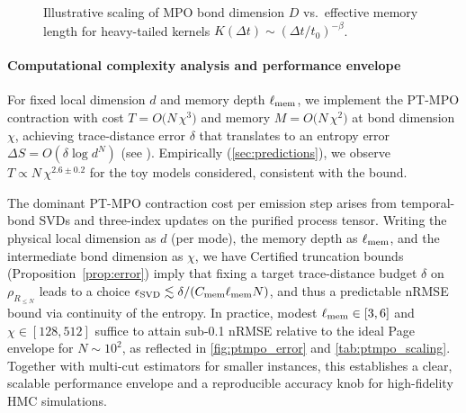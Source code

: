 \documentclass[a4paper,11pt]{article}
\newcommand{\HMC}{\textsc{HMC}\xspace}
\theoremstyle{plain}
\theoremstyle{definition}
\theoremstyle{remark}
\begin{document}
\begin{figure}[htbp]
    \centering
    \caption{Illustrative scaling of MPO bond dimension $D$ vs.\ effective memory length for heavy-tailed kernels $K(\Delta t)\sim (\Delta t/t_0)^{-\beta}$.}
    \label{fig:heavy-tail}
    \end{figure}


\paragraph{Computational complexity analysis and performance envelope}
For fixed local dimension $d$ and memory depth $\ell_{\rm mem}$, we implement the PT-MPO contraction with cost $T=O\!\big(N\,\chi^3\big)$ and memory $M=O\!\big(N\,\chi^2\big)$ at bond dimension $\chi$, achieving trace-distance error $\delta$ that translates to an entropy error $\Delta S=O(\delta\log d^N)$ (see ). Empirically (\cref{sec:predictions}), we observe $T\propto N\,\chi^{2.6\pm0.2}$ for the toy models considered, consistent with the bound.

The dominant PT-MPO contraction cost per emission step arises from temporal-bond SVDs and three-index updates on the purified process tensor. Writing the physical local dimension as $d$ (per mode), the memory depth as $\ell_{\rm mem}$, and the intermediate bond dimension as $\chi$, we have
Certified truncation bounds (Proposition~\ref{prop:error}) imply that fixing a target trace-distance budget $\delta$ on $\rho_{R_{\le N}}$ leads to a choice $\epsilon_{\rm SVD}\lesssim \delta/(C_{\rm mem}\ell_{\rm mem} N)$, and thus a predictable nRMSE bound via continuity of the entropy. In practice, modest $\ell_{\rm mem}\in[3,6]$ and $\chi\in[128,512]$ suffice to attain sub-0.1 nRMSE relative to the ideal Page envelope for $N\sim 10^2$, as reflected in \cref{fig:ptmpo_error} and \cref{tab:ptmpo_scaling}. Together with multi-cut estimators for smaller instances, this establishes a clear, scalable performance envelope and a reproducible accuracy knob for high-fidelity \HMC{} simulations.
\end{document}
